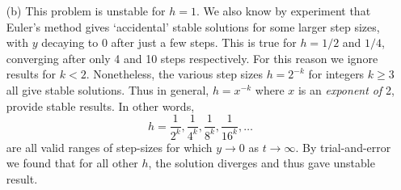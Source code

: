 \documentclass[11pt,a4paper]{article}
\begin{document}
\begin{enumerate}
	\item[(b)] This problem is unstable for $h=1$. We also know by experiment that Euler's method gives `accidental' stable solutions for some larger step sizes, with $y$ decaying to 0 after just a few steps. This is true for $h=1/2$ and $1/4$, converging after only 4 and 10 steps respectively. For this reason we ignore results for $k<2$. Nonetheless, the various step sizes $h=2^{-k}$ for integers $k \ge 3$ all give stable solutions. Thus in general, $h=x^{-k}$ where $x$ is an \emph{exponent of} 2, provide stable results. In other words, 
	$$h=\frac{1}{2^k}, \frac{1}{4^k}, \frac{1}{8^k}, \frac{1}{16^k}, \ldots$$
	are all valid ranges of step-sizes for which $y \rightarrow 0$ as $t \rightarrow \infty$. By trial-and-error we found that for all other $h$, the solution diverges and thus gave unstable result.
	
\end{enumerate}


\pagebreak 
\end{document}
